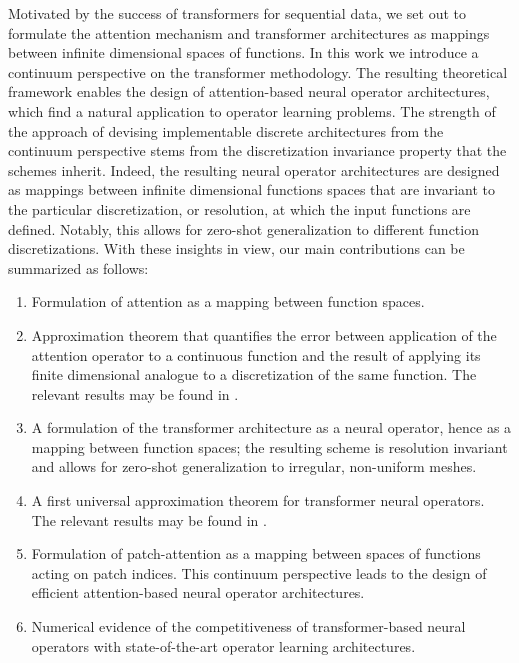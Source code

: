 \documentclass[twoside]{article}
\newcommand{\1}{\mathbbm{1}}
\begin{document}
Motivated by the success of transformers for sequential data, we set out to formulate the attention mechanism and transformer architectures as mappings between infinite dimensional spaces of functions. In this work we introduce a continuum perspective on the transformer methodology. The resulting theoretical framework enables the design of attention-based neural operator architectures, which find a natural application to operator learning problems. The strength of the approach of devising implementable discrete architectures from the continuum perspective stems from the discretization invariance property that the schemes inherit. Indeed, the resulting neural operator architectures are designed as mappings between infinite dimensional functions spaces that are invariant to the particular discretization, or resolution, at which the input functions are defined. Notably, this allows for zero-shot generalization to different function discretizations. With these insights in view, our main contributions can be summarized as follows:
\begin{enumerate}
    \item
    \label{cont:1}
    Formulation of attention as a mapping between function spaces.
    \item 
    \label{cont:2}
    Approximation theorem that quantifies the error between application of the attention operator to a continuous function and the result of applying its finite dimensional analogue to a discretization of the same function. The relevant results may be found in .
    \item 
    \label{cont:3}
    A formulation of the transformer architecture as a neural operator, hence as a mapping between function spaces; the resulting scheme is resolution invariant and allows for zero-shot generalization to irregular, non-uniform meshes.
    \item 
    \label{cont:4}
    A first universal approximation theorem for transformer neural operators. The relevant results may be found in .
    \item 
    \label{cont:5}
    Formulation of patch-attention as a mapping between spaces of functions acting on patch indices. This continuum perspective leads to the design of efficient attention-based neural operator architectures.
    \item 
    \label{cont:6} 
    Numerical evidence of the competitiveness of transformer-based neural
    operators with state-of-the-art operator learning architectures. 
\end{enumerate}
\end{document}
